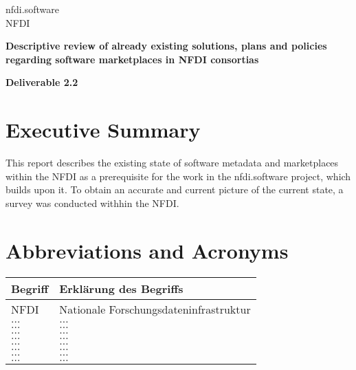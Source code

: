 \documentclass[headsepline,titlepage,twoside,12pt]{report}
\author{Vorname Name}
\begin{document}
\allowdisplaybreaks%

\begin{titlepage}
\thispagestyle{empty}
\begin{center}

{\large nfdi.software\\[1mm]}
NFDI\\

\vspace{2cm}

{\large\textbf{Descriptive review of already existing solutions, plans and policies regarding software marketplaces in NFDI consortias}}\\
\vspace*{4cm}


{\Huge\textbf{Deliverable 2.2}}\\

\end{center}
\end{titlepage}

\tableofcontents

\chapter{Executive Summary}
This report describes the existing state of software metadata and marketplaces within the NFDI as a prerequisite for the work in the nfdi.software project, which builds upon it.
To obtain an accurate and current picture of the current state, a survey was conducted withhin the NFDI.


\chapter{Abbreviations and Acronyms}
\begin{tabularx}{\textwidth}{lX}
\toprule
\textrm{Begriff}			&\textrm{Erklärung des Begriffs}\\
\midrule
NFDI					&Nationale Forschungsdateninfrastruktur\\
$\ldots$				&$\ldots$\\
$\ldots$				&$\ldots$\\
$\ldots$				&$\ldots$\\
$\ldots$				&$\ldots$\\
$\ldots$				&$\ldots$\\
$\ldots$				&$\ldots$\\
$\ldots$				&$\ldots$\\
$\ldots$				&$\ldots$\\
\bottomrule
\end{tabularx}
\end{document}
